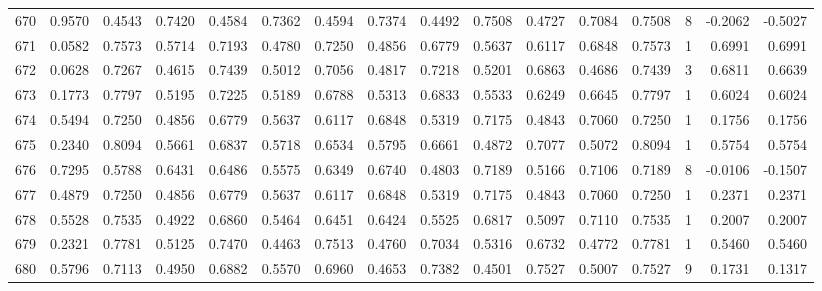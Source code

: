 \begin{tabular}{lrrrrrrrrrrrrrrr}
670 &      0.9570 &  0.4543 &  0.7420 &  0.4584 &  0.7362 &  0.4594 &  0.7374 &  0.4492 &  0.7508 &  0.4727 &   0.7084 &     0.7508 &      8 &                   -0.2062 &                    -0.5027 \\
671 &      0.0582 &  0.7573 &  0.5714 &  0.7193 &  0.4780 &  0.7250 &  0.4856 &  0.6779 &  0.5637 &  0.6117 &   0.6848 &     0.7573 &      1 &                    0.6991 &                     0.6991 \\
672 &      0.0628 &  0.7267 &  0.4615 &  0.7439 &  0.5012 &  0.7056 &  0.4817 &  0.7218 &  0.5201 &  0.6863 &   0.4686 &     0.7439 &      3 &                    0.6811 &                     0.6639 \\
673 &      0.1773 &  0.7797 &  0.5195 &  0.7225 &  0.5189 &  0.6788 &  0.5313 &  0.6833 &  0.5533 &  0.6249 &   0.6645 &     0.7797 &      1 &                    0.6024 &                     0.6024 \\
674 &      0.5494 &  0.7250 &  0.4856 &  0.6779 &  0.5637 &  0.6117 &  0.6848 &  0.5319 &  0.7175 &  0.4843 &   0.7060 &     0.7250 &      1 &                    0.1756 &                     0.1756 \\
675 &      0.2340 &  0.8094 &  0.5661 &  0.6837 &  0.5718 &  0.6534 &  0.5795 &  0.6661 &  0.4872 &  0.7077 &   0.5072 &     0.8094 &      1 &                    0.5754 &                     0.5754 \\
676 &      0.7295 &  0.5788 &  0.6431 &  0.6486 &  0.5575 &  0.6349 &  0.6740 &  0.4803 &  0.7189 &  0.5166 &   0.7106 &     0.7189 &      8 &                   -0.0106 &                    -0.1507 \\
677 &      0.4879 &  0.7250 &  0.4856 &  0.6779 &  0.5637 &  0.6117 &  0.6848 &  0.5319 &  0.7175 &  0.4843 &   0.7060 &     0.7250 &      1 &                    0.2371 &                     0.2371 \\
678 &      0.5528 &  0.7535 &  0.4922 &  0.6860 &  0.5464 &  0.6451 &  0.6424 &  0.5525 &  0.6817 &  0.5097 &   0.7110 &     0.7535 &      1 &                    0.2007 &                     0.2007 \\
679 &      0.2321 &  0.7781 &  0.5125 &  0.7470 &  0.4463 &  0.7513 &  0.4760 &  0.7034 &  0.5316 &  0.6732 &   0.4772 &     0.7781 &      1 &                    0.5460 &                     0.5460 \\
680 &      0.5796 &  0.7113 &  0.4950 &  0.6882 &  0.5570 &  0.6960 &  0.4653 &  0.7382 &  0.4501 &  0.7527 &   0.5007 &     0.7527 &      9 &                    0.1731 &                     0.1317 \\

\end{tabular}

